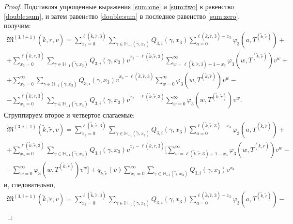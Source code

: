 \documentclass[a4paper,12pt,russian]{extarticle}
\begin{document}
\begin{proof}
Подставляя упрощенные выражения \eqref{sum:one} и \eqref{sum:two} в равенство \eqref{double:sum}, и затем равенcтво \eqref{double:sum} в последнее равенство  \eqref{sum:zero}, получим:
\begin{multline*}
\mathfrak{M}^{(3,i+1)}(\tilde{k},\tilde{r},v) = \sum_{x_3=0}^{\ell(\tilde{k},\tilde{r},3)}\sum_{\gamma \in {\mathbb H}_{-1}(\tilde{\gamma},x_3)} Q_{3,i}(\gamma,x_3) \sum_{a=0}^{\ell(\tilde{k},\tilde{r},3) - x_3} \varphi_3(a,T^{(\tilde{k},\tilde{r})}) + \\
+ \sum_{x_3=0}^{\ell(\tilde{k},\tilde{r},3)}  \sum_{\gamma \in {\mathbb H}_{-1}(\tilde{\gamma},x_3)} Q_{3,i}(\gamma,x_3) v^{x_3-\ell(\tilde{k},\tilde{r},3)}  \sum_{w=\ell(\tilde{k},\tilde{r},3) + 1 -x_3}^{\infty}
\varphi_3(w,T^{(\tilde{k},\tilde{r})}) v^w + \\
+ \sum_{x_3=0}^{\infty} \sum_{\gamma \in {\mathbb H}_{-1}(\tilde{\gamma},x_3)} Q_{3,i}(\gamma,x_3) v^{x_3-\ell(\tilde{k},\tilde{r},3)}\sum_{w=0}^{\infty} 
\varphi_3(w,T^{(\tilde{k},\tilde{r})}) v^w - \\
- \sum_{x_3=0}^{\ell(\tilde{k},\tilde{r},3)} \sum_{\gamma \in {\mathbb H}_{-1}(\tilde{\gamma},x_3)} Q_{3,i}(\gamma,x_3) v^{x_3-\ell(\tilde{k},\tilde{r},3)}\sum_{w=0}^{\infty}  
\varphi_3(w,T^{(\tilde{k},\tilde{r})}) v^w.
\end{multline*}
Сгруппируем второе и четвертое слагаемые:
\begin{multline*}
\mathfrak{M}^{(3,i+1)}(\tilde{k},\tilde{r},v)= \sum_{x_3=0}^{\ell(\tilde{k},\tilde{r},3)}\sum_{\gamma \in {\mathbb H}_{-1}(\tilde{\gamma},x_3)} Q_{3,i}(\gamma,x_3) \sum_{a=0}^{\ell(\tilde{k},\tilde{r},3) - x_3} \varphi_3(a,T^{(\tilde{k},\tilde{r})}) + \\
+ \sum_{x_3=0}^{\ell(\tilde{k},\tilde{r},3)}  \sum_{\gamma \in {\mathbb H}_{-1}(\tilde{\gamma},x_3)} Q_{3,i}(\gamma,x_3) v^{x_3-\ell(\tilde{k},\tilde{r},3)}  [ \sum_{w=\ell(\tilde{k},\tilde{r},3) + 1 -x_3}^{\infty}
\varphi_3(w,T^{(\tilde{k},\tilde{r})}) v^w -\\-\sum_{w=0}^{\infty} 
\varphi_3(w,T^{(\tilde{k},\tilde{r})}) v^w ] 
+ q_{\tilde{k},\tilde{r}}(v) \sum_{x_3=0}^{\infty} \sum_{\gamma \in {\mathbb H}_{-1}(\tilde{\gamma},x_3)} Q_{3,i}(\gamma,x_3) v^{x_3}
\end{multline*}
и, следовательно,
\begin{multline}
\mathfrak{M}^{(3,i+1)}(\tilde{k},\tilde{r},v)= \sum_{x_3=0}^{\ell(\tilde{k},\tilde{r},3)}\sum_{\gamma \in {\mathbb H}_{-1}(\tilde{\gamma},x_3)} Q_{3,i}(\gamma,x_3) \sum_{a=0}^{\ell(\tilde{k},\tilde{r},3) - x_3} \varphi_3(a,T^{(\tilde{k},\tilde{r})}) - \\

\end{multline}
\end{proof}
\end{document}
